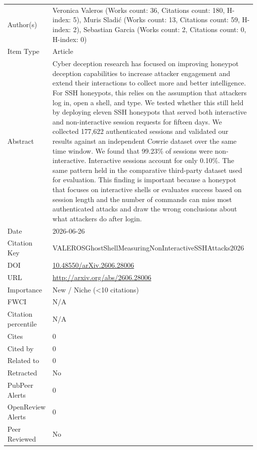 \documentclass{article}
\begin{document}
\begin{enumerate}[label=\arabic*., font=\Large]
\begin{longtable}{p{} p{\contentcolwidth-2\tabcolsep}}
\toprule
Author(s) & Veronica Valeros (Works count: 36, Citations count: 180, H-index: 5), Muris Sladić (Works count: 13, Citations count: 59, H-index: 2), Sebastian Garcia (Works count: 2, Citations count: 0, H-index: 0) \\
Item Type & Article \\
Abstract & Cyber deception research has focused on improving honeypot deception capabilities to increase attacker engagement and extend their interactions to collect more and better intelligence. For SSH honeypots, this relies on the assumption that attackers log in, open a shell, and type. We tested whether this still held by deploying eleven SSH honeypots that served both interactive and non-interactive session requests for fifteen days. We collected 177,622 authenticated sessions and validated our results against an independent Cowrie dataset over the same time window. We found that 99.23\% of sessions were non-interactive. Interactive sessions account for only 0.10\%. The same pattern held in the comparative third-party dataset used for evaluation. This finding is important because a honeypot that focuses on interactive shells or evaluates success based on session length and the number of commands can miss most authenticated attacks and draw the wrong conclusions about what attackers do after login. \\
Date & 2026-06-26 \\
Citation Key & VALEROSGhostShellMeasuringNonInteractiveSSHAttacks2026 \\
DOI & \href{http://doi.org/10.48550/arXiv.2606.28006}{10.48550/arXiv.2606.28006} \\
URL & \url{http://arxiv.org/abs/2606.28006} \\
Importance & New / Niche (<10 citations) \\
FWCI & N/A \\
Citation percentile & N/A \\
Cites & 0 \\
Cited by & 0 \\
Related to & 0 \\
Retracted & No \\
PubPeer Alerts & 0 \\
OpenReview Alerts & 0 \\
Peer Reviewed & No \\
\bottomrule
\end{longtable}


\end{enumerate}
\end{document}
